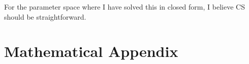 \documentclass[WP]{AEA}
\begin{document}
For the parameter space where I have solved this in closed form, I believe CS should be straightforward.  

%
%
%
%
%
%




\appendix

\section{Mathematical Appendix}
\end{document}
